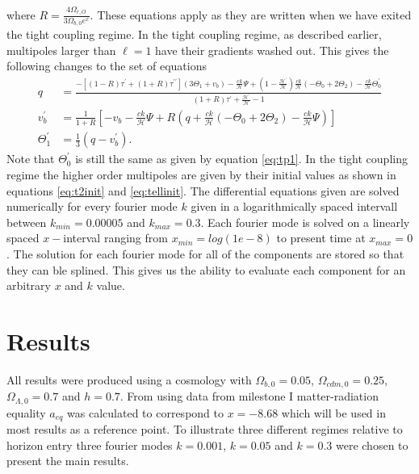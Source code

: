 \documentclass[onecolumn]{aastex62}
\begin{document}
where $R = \frac{4\Omega_{r,O}}{3\Omega_{b,0}e^x}$. These equations apply as they are written when we have exited the tight coupling regime. In the tight coupling regime, as described earlier, multipoles larger than $\ell=1$ have their gradients washed out. This gives the following changes to the set of equations 
\begin{align}
    q &= \frac{-[(1-R)\tau^\prime + (1+R)\tau^{\prime\prime}](3\Theta_1+v_b) -
    \frac{ck}{\mathcal{H}}\Psi + (1-\frac{\mathcal{H}^\prime}{\mathcal{H}})\frac{ck}{\mathcal{H}}(-\Theta_0 +
    2\Theta_2) - \frac{ck}{\mathcal{H}}\Theta_0^\prime}{(1+R)\tau^\prime + \frac{\mathcal{H}^\prime}{\mathcal{H}} -
    1}\\
    v_b^\prime &= \frac{1}{1+R} \left[-v_b - \frac{ck}{\mathcal{H}}\Psi + R(q +
    \frac{ck}{\mathcal{H}}(-\Theta_0 + 2\Theta_2) - \frac{ck}{\mathcal{H}}\Psi)\right]\\
    \Theta^\prime_1 &= \frac{1}{3} (q - v_b^\prime).
\end{align}
Note that $\Theta^\prime_0$ is still the same as given by equation \ref{eq:tp1}.  In the tight coupling regime the higher order multipoles are given by their initial values as shown in equations \ref{eq:t2init} and \ref{eq:tellinit}. The differential equations given are solved numerically for every fourier mode $k$ given in a logarithmically spaced intervall between $k_{min}=0.00005$ and $k_{max}=0.3$. Each fourier mode is solved on a linearly spaced $x-$interval ranging from $x_{min}=log(1e-8)$ to present time at $x_{max}=0$. The solution for each fourier mode for all of the components are stored so that they can ble splined. This gives us the ability to evaluate each component for an arbitrary $x$ and $k$ value.
\section{Results}
\label{sec:results}
All results were produced using a cosmology with $\Omega_{b,0}=0.05$, $\Omega_{cdm,0}=0.25$, $\Omega_{\Lambda,0}=0.7$ and $h=0.7$. From using data from milestone I matter-radiation equality $a_{eq}$ was calculated to correspond to $x=-8.68$ which will be used in most results as a reference point. To illustrate three different regimes relative to horizon entry three fourier modes $k=0.001$, $k=0.05$ and $k=0.3$ were chosen to present the main results.
\end{document}
